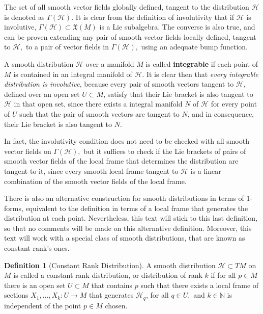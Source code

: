 \documentclass[12pt, letterpaper, reqno]{amsart}
\theoremstyle{definition}
\newtheorem{df}{Definition}
\theoremstyle{plain}
\theoremstyle{remark}
\begin{document}
The set of all smooth vector fields  globally defined, tangent to the distribution $ \mathcal{H} $ is denoted as $ \Gamma( \mathcal{H}) $. It is clear from the definition of involutivity that if $ \mathcal{H} $ is involutive, $ \Gamma (\mathcal{H})\subset \mathfrak{X}(M) $ is a Lie subalgebra. The converse is also true, and can be proven extending any pair of smooth vector fields locally defined, tangent to $ \mathcal{H} ,$ to a pair of vector fields in $ \Gamma( \mathcal{H}), $ using an adequate bump function. 

A smooth distribution $ \mathcal{H} $ over a manifold $ M $ is called \textbf{integrable} if each point of $ M $ is contained in an integral manifold of $ \mathcal{H}. $  It is clear then that \textit{every integrable distribution is involutive}, because every pair of smooth vectors tangent to $ \mathcal{H}, $ defined over an open set $ U\subset M $, satisfy that their Lie bracket is also tangent to $ \mathcal{H} $ in that open set, since there exists a integral manifold $ N $  of $ \mathcal{H} $ for every point of $ U $ such that the pair of smooth vectors are tangent to $ N $, and in consequence, their Lie bracket is also tangent to $ N. $  

In fact, the involutivity condition does not need to be checked with all smooth vector fields on $ \Gamma( \mathcal{H}), $ but it suffices to check if the Lie brackets of pairs of smooth vector fields of the local frame that determines the distribution are tangent to it, since every smooth local frame tangent to $ \mathcal{H} $ is a linear combination of the smooth vector fields of the local frame. 

There is also an alternative construction for smooth distributions in terms of 1-forms, equivalent to the definition in terms of a local frame that generates the distribution at each point. Nevertheless, this text will stick to this last definition, so that no comments will be made on this alternative definition. Moreover, this text will work with a special class of smooth distributions, that are known as constant rank's ones.

\begin{df}[Constant Rank Distribution]
	A smooth distribution $ \mathcal{H}\subset TM $ on $ M $ is called a constant rank distribution, or distribution of rank $ k $ if for all $ p\in M $ there is an open set $ U\subset M $ that contains $ p $ such that there exists a local frame of sections $X_1,\dots,X_k: U \rightarrow {M}
	$  that generates $ \mathcal{H}_q $, for all $ q\in U, $ and $ k\in \mathbb{N}  $ is independent of the point $ p\in M $ chosen.  
\end{df}
\end{document}
